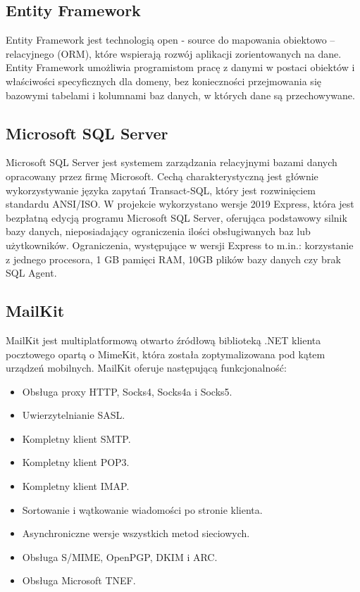 \documentclass[12pt,a4paper]{article}
\begin{document}
		\subsection{Entity Framework}		 
		 	\indent Entity Framework jest technologią open - source do mapowania obiektowo – relacyjnego (ORM), które wspierają rozwój aplikacji zorientowanych na dane.
		 	Entity Framework umożliwia programistom pracę z danymi w postaci obiektów i właściwości specyficznych dla domeny, bez konieczności przejmowania się bazowymi
		 	tabelami i kolumnami baz danych, w których dane są przechowywane. 

		\subsection{Microsoft SQL Server}		 
		 	\indent Microsoft SQL Server jest systemem zarządzania relacyjnymi bazami danych opracowany przez firmę Microsoft. Cechą charakterystyczną jest głównie wykorzystywanie języka
		 	zapytań	Transact-SQL, który jest rozwinięciem standardu ANSI/ISO. W projekcie wykorzystano wersje 2019 Express, która jest bezpłatną edycją programu Microsoft SQL Server, oferująca
		 	podstawowy silnik bazy danych, nieposiadający ograniczenia ilości obsługiwanych baz lub użytkowników. Ograniczenia, występujące w wersji Express to  m.in.:
		 	korzystanie z jednego procesora, 1 GB pamięci RAM, 10GB plików bazy danych czy brak SQL Agent.
		
		\subsection{MailKit}
			\indent MailKit jest multiplatformową otwarto źródłową biblioteką .NET klienta pocztowego opartą o MimeKit, która została zoptymalizowana pod kątem urządzeń mobilnych.
			MailKit oferuje następującą funkcjonalność:
			\begin{itemize}
				\item Obsługa proxy HTTP, Socks4, Socks4a i Socks5.
				\item Uwierzytelnianie SASL.
				\item Kompletny klient SMTP.
				\item Kompletny klient POP3.
				\item Kompletny klient IMAP.
				\item Sortowanie i wątkowanie wiadomości po stronie klienta.
				\item Asynchroniczne wersje wszystkich metod sieciowych.
				\item Obsługa S/MIME, OpenPGP, DKIM i ARC.
				\item Obsługa Microsoft TNEF.
			\end{itemize}
\end{document}
